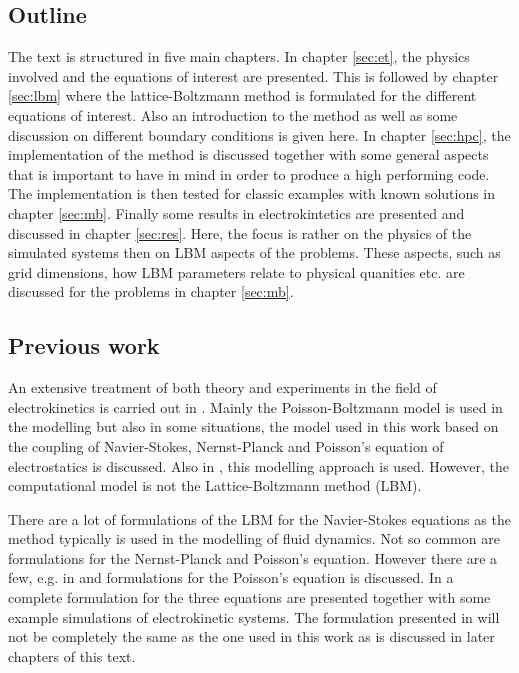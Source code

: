 \subsection{Outline}
The text is structured in five main chapters. In chapter \ref{sec:et},
the physics involved and the equations of interest are presented. This
is followed by chapter \ref{sec:lbm} where the lattice-Boltzmann
method is formulated for the different equations of interest. Also an
introduction to the method as well as some discussion on different
boundary conditions is given here. In chapter \ref{sec:hpc}, the
implementation of the method is discussed together with some general
aspects that is important to have in mind in order to produce a high
performing code. The implementation is then tested for classic
examples with known solutions in chapter \ref{sec:mb}. Finally some
results in electrokintetics are presented and discussed in chapter
\ref{sec:res}. Here, the focus is rather on the physics of the
simulated systems then on LBM aspects of the problems. These aspects,
such as grid dimensions, how LBM parameters relate to physical
quanities etc. are discussed for the problems in chapter \ref{sec:mb}.

\subsection{Previous work}
An extensive treatment of both theory and experiments in the field of
electrokinetics is carried out in \cite{dongquing-ren-book}. Mainly
the Poisson-Boltzmann model is used in the modelling but also in some
situations, the model used in this work based on the coupling of
Navier-Stokes, Nernst-Planck and Poisson's equation of electrostatics
is discussed. Also in \cite{ren-elvis-paper}, this modelling approach
is used. However, the computational model is not the Lattice-Boltzmann
method (LBM). 

There are a lot of formulations of the LBM for the Navier-Stokes
equations as the method typically is used in the modelling of fluid
dynamics. Not so common are formulations for the Nernst-Planck and
Poisson's equation. However there are a few, e.g. in \cite{wang-poi}
and \cite{chai_poi} formulations for the Poisson's equation is
discussed. In \cite{lbm-wang} a complete formulation for the three
equations are presented together with some example simulations of
electrokinetic systems. The formulation presented in \cite{lbm-wang}
will not be completely the same as the one used in this work as is
discussed in later chapters of this text. 
